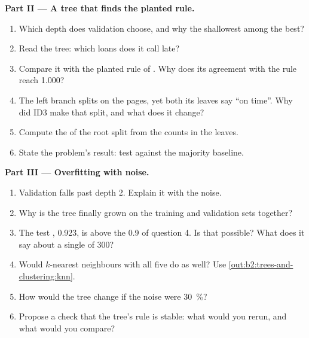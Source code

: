 \begin{problem}
\medskip\noindent\textbf{Part II --- A tree that finds the planted rule.}\par\nopagebreak
\begin{enumerate}[resume, beginpenalty=10000]
\item Which depth does validation choose, and why the shallowest among the best?
\item Read the tree: which loans does it call late?
\item Compare it with the planted rule of . Why does its agreement with the rule reach 1.000?
\item The left branch splits on the pages, yet both its leaves say ``on time''. Why did ID3 make that split, and what
does it change?
\item Compute the  of the root split from the counts in the leaves.
\item State the problem's result: test  against the majority baseline.
\end{enumerate}

\medskip\noindent\textbf{Part III --- Overfitting with noise.}\par\nopagebreak
\begin{enumerate}[resume, beginpenalty=10000]
\item Validation  falls past depth 2. Explain it with the noise.
\item Why is the tree finally grown on the training and validation sets together?
\item The test , 0.923, is above the 0.9 of question 4. Is that possible? What does it say about a single  of 300?
\item Would $k$-nearest neighbours with all five  do as well? Use \cref{out:b2:trees-and-clustering:knn}.
\item How would the tree change if the noise were 30~\%?
\item Propose a check that the tree's rule is stable: what would you rerun, and what would you compare?
\end{enumerate}


\end{problem}
